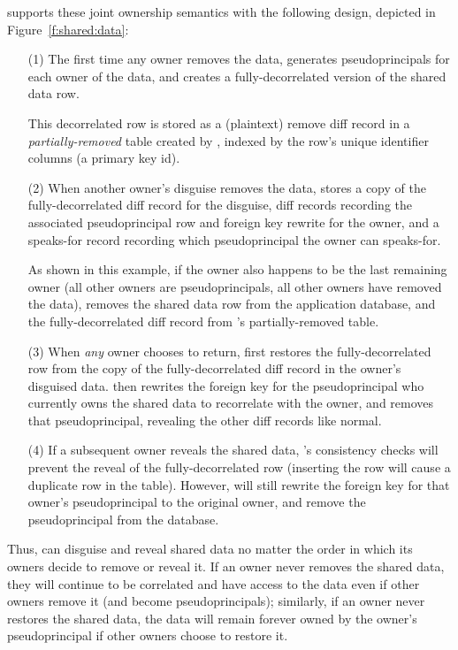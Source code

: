 \sys supports these joint ownership semantics with the following design,
depicted in Figure~\ref{f:shared:data}:
%
\begin{enumerate}
    \item[(1)] The first time any owner removes the data, \sys generates pseudoprincipals for
each owner of the data, and creates a fully-decorrelated version of the shared
data row. 

This decorrelated row is stored as a (plaintext) remove diff record in a
\emph{partially-removed} table created by \sys, indexed by the row's unique
identifier columns (\eg a primary key id).

\item[(2)]
When another owner's disguise removes the data, \sys stores a copy of the
fully-decorrelated diff record for the disguise, diff records recording the
associated pseudoprincipal row and foreign key rewrite for the owner, and a
speaks-for record recording which pseudoprincipal the owner can speaks-for.
%

%
As shown in this example, if the owner also happens to be the last remaining
        owner (all other owners are pseudoprincipals, \ie all other owners have
        removed the data), \sys removes the shared data row from the application
        database, and the fully-decorrelated diff record from \sys's
        partially-removed table.
%

\item[(3)]
When \emph{any} owner chooses to return, \sys first restores the
fully-decorrelated row from the copy of the fully-decorrelated diff record in
the owner's disguised data.  \sys then rewrites the foreign key for the
pseudoprincipal who currently owns the shared data to recorrelate with the
owner, and removes that pseudoprincipal, revealing the other diff records like
normal.
%

\item[(4)] If a subsequent owner reveals the shared data, \sys's consistency checks will
prevent the reveal of the fully-decorrelated row (inserting the row will cause a
duplicate row in the table). However, \sys will still rewrite the foreign key
for that owner's pseudoprincipal to the original owner, and remove the
pseudoprincipal from the database.
%


\end{enumerate}

%



%
Thus, \sys can disguise and reveal shared data no matter the order in which its
owners decide to remove or reveal it. If an owner never removes the shared data,
they will continue to be correlated and have access to the data even if other
owners remove it (and become pseudoprincipals); similarly, if an owner never
restores the shared data, the data will remain forever owned by the owner's
pseudoprincipal if other owners choose to restore it.
%


